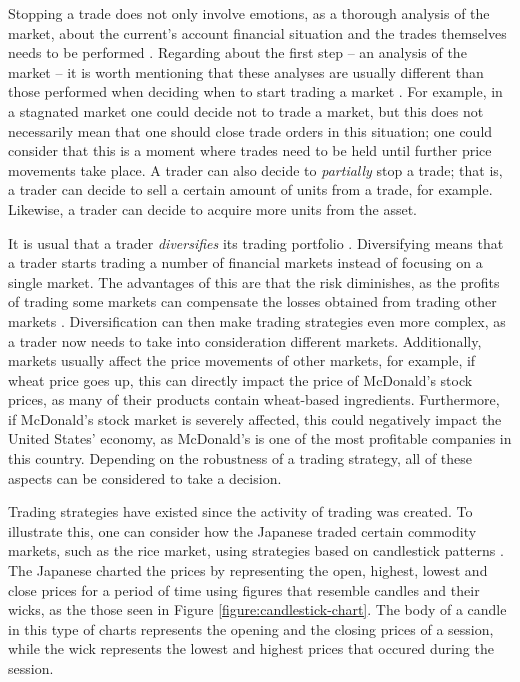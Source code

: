 Stopping a trade does not only involve emotions, as a thorough analysis of the
market, about the current's account financial situation and the trades
themselves needs to be performed \cite{Kadiri2015}. Regarding about the first
step -- an analysis of the market -- it is worth mentioning that these analyses
are usually different than those performed when deciding when to start trading a
market \cite{Conrad1998} \cite{Muller1997}. For example, in a stagnated market
one could decide not to trade a market, but this does not necessarily mean that
one should close trade orders in this situation; one could consider that this is
a moment where trades need to be held until further price movements take
place. A trader can also decide to \textit{partially} stop a trade; that is, a
trader can decide to sell a certain amount of units from a trade, for
example. Likewise, a trader can decide to acquire more units from the asset.

It is usual that a trader \textit{diversifies} its trading portfolio
\cite{Muller1997}. Diversifying means that a trader starts trading a number of
financial markets instead of focusing on a single market. The advantages of this
are that the risk diminishes, as the profits of trading some markets can
compensate the losses obtained from trading other markets
\cite{Muller1997}. Diversification can then make trading strategies even more
complex, as a trader now needs to take into consideration different
markets. Additionally, markets usually affect the price movements of other
markets, for example, if wheat price goes up, this can directly impact the price
of McDonald's stock prices, as many of their products contain wheat-based
ingredients. Furthermore, if McDonald's stock market is severely affected, this
could negatively impact the United States' economy, as McDonald's is one of the
most profitable companies in this country. Depending on the robustness of a
trading strategy, all of these aspects can be considered to take a decision.

Trading strategies have existed since the activity of trading was created.  To
illustrate this, one can consider how the Japanese traded certain commodity
markets, such as the rice market, using strategies based on candlestick patterns
\cite{Nison1991}. The Japanese charted the prices by representing the open,
highest, lowest and close prices for a period of time using figures that
resemble candles and their wicks, as the those seen in Figure
\ref{figure:candlestick-chart}. The body of a candle in this type of charts
represents the opening and the closing prices of a session, while the wick
represents the lowest and highest prices that occured during the session.

